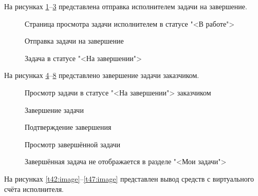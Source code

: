 На рисунках \ref{t33:image}--\ref{t36:image} представлена отправка исполнителем задачи на завершение.

\begin{figure}[ht]
	\caption{Страница просмотра задачи исполнителем в статусе "<В работе">}
	\label{t33:image}
\end{figure}
\clearpage

\begin{figure}[ht]
	\caption{Отправка задачи на завершение}
	\label{t35:image}
\end{figure}

\begin{figure}[ht]
	\caption{Задача в статусе "<На завершении">}
	\label{t36:image}
\end{figure}

На рисунках \ref{t37:image}--\ref{t41:image} представлено завершение задачи заказчиком.
\clearpage

\begin{figure}[ht]
	\caption{Просмотр задачи в статусе "<На завершении"> заказчиком}
	\label{t37:image}
\end{figure}

\begin{figure}[ht]
	\caption{Завершение задачи}
	\label{t38:image}
\end{figure}
\clearpage

\begin{figure}[ht]
	\caption{Подтверждение завершения}
	\label{t39:image}
\end{figure}

\begin{figure}[ht]
	\caption{Просмотр завершённой задачи}
	\label{t40:image}
\end{figure}

\begin{figure}[ht]
	\caption{Завершённая задача не отображается в разделе "<Мои задачи">}
	\label{t41:image}
\end{figure}
\clearpage

На рисунках \ref{t42:image}--\ref{t47:image} представлен вывод средств с виртуального счёта исполнителя.

